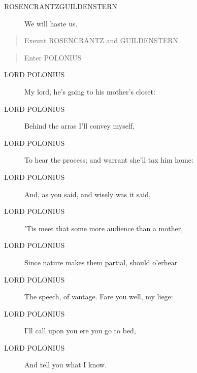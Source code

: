 \documentclass{article}
\begin{document}
\begin{description}
            
\item[ROSENCRANTZGUILDENSTERN] We will haste us.
\end{description}
          
\begin{quote}
Exeunt ROSENCRANTZ and GUILDENSTERN
\end{quote}
          
\begin{quote}
Enter POLONIUS
\end{quote}
          
\begin{description}
            
\item[LORD POLONIUS] My lord, he's going to his mother's closet:
\item[LORD POLONIUS] Behind the arras I'll convey myself,
\item[LORD POLONIUS] To hear the process; and warrant she'll tax him home:
\item[LORD POLONIUS] And, as you said, and wisely was it said,
\item[LORD POLONIUS] 'Tis meet that some more audience than a mother,
\item[LORD POLONIUS] Since nature makes them partial, should o'erhear
\item[LORD POLONIUS] The speech, of vantage. Fare you well, my liege:
\item[LORD POLONIUS] I'll call upon you ere you go to bed,
\item[LORD POLONIUS] And tell you what I know.
\end{description}
          
\end{document}
